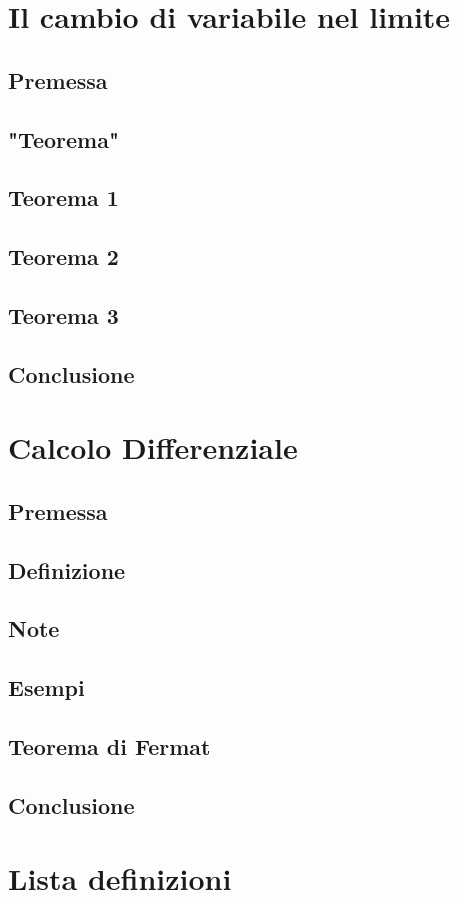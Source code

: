 \documentclass[fontsize = 20px, paper = a4]{article}
\begin{document}
\section{Il cambio di variabile nel limite}
\subsection{Premessa}
\subsection{"Teorema"}
\subsection*{Teorema 1}
\subsection{Teorema 2}
\subsection{Teorema 3}
\subsection{Conclusione}
\section{Calcolo Differenziale}
\subsection{Premessa}
\subsection{Definizione}
\subsection{Note}
\subsection{Esempi}
\subsection{Teorema di Fermat}
\subsection{Conclusione}
\section{Lista definizioni}
\end{document}
